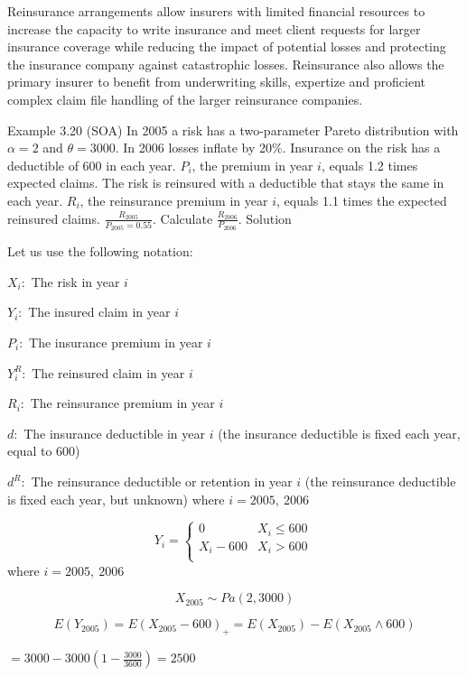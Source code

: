 \documentclass[]{book}
\theoremstyle{definition}
\theoremstyle{definition}
\theoremstyle{definition}
\theoremstyle{remark}
\begin{document}
Reinsurance arrangements allow insurers with limited financial resources
to increase the capacity to write insurance and meet client requests for
larger insurance coverage while reducing the impact of potential losses
and protecting the insurance company against catastrophic losses.
Reinsurance also allows the primary insurer to benefit from underwriting
skills, expertize and proficient complex claim file handling of the
larger reinsurance companies.

Example 3.20 (SOA) In 2005 a risk has a two-parameter Pareto
distribution with \(\alpha = 2\) and \(\theta = 3000\). In 2006 losses
inflate by 20\%. Insurance on the risk has a deductible of 600 in each
year. \(P_{i}\), the premium in year \(i\), equals 1.2 times expected
claims. The risk is reinsured with a deductible that stays the same in
each year. \(R_{i}\), the reinsurance premium in year \(i\), equals 1.1
times the expected reinsured claims.
\(\frac{R_{2005}}{P_{2005} = 0.55}\). Calculate
\(\frac{R_{2006}}{P_{2006}}\). Solution

Let us use the following notation:

\(X_{i}:\) The risk in year \(i\)

\(Y_{i}:\) The insured claim in year \(i\)

\(P_{i}:\) The insurance premium in year \(i\)

\(Y_{i}^{R}:\) The reinsured claim in year \(i\)

\(R_{i}:\) The reinsurance premium in year \(i\)

\(d:\) The insurance deductible in year \(i\) (the insurance deductible
is fixed each year, equal to 600)

\(d^{R}:\) The reinsurance deductible or retention in year \(i\) (the
reinsurance deductible is fixed each year, but unknown) where
\(i = 2005,\ 2006\)

\[Y_{i} = \left\{ \begin{matrix}
0 & X_{i} \leq 600 \\
X_{i} - 600 & X_{i} > 600 \\
\end{matrix} \right.\ \] where \(i = 2005,\ 2006\)

\[X_{2005}\sim Pa\left( 2,3000 \right)\]

\[E\left( Y_{2005} \right) = E\left( X_{2005} - 600 \right)_{+} = E\left( X_{2005} \right) - E\left( X_{2005} \land 600 \right)\]

\(= 3000 - 3000\left( 1 - \frac{3000}{3600} \right) = 2500\)
\end{document}

